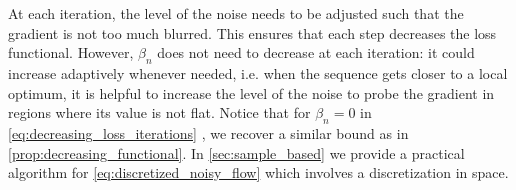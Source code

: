 At each iteration, the level of the noise needs to be adjusted such that the gradient is not too much blurred. This ensures that each step decreases the loss functional. However, $\beta_n$ does not need to decrease at each iteration: it could increase adaptively whenever needed, i.e. when  the sequence gets closer to a local optimum, it is helpful to increase the level of the noise to probe the gradient in regions where its value is not flat.
	Notice that for $\beta_n = 0$  in \cref{eq:decreasing_loss_iterations} , we recover a similar bound as in \cref{prop:decreasing_functional}.
In \cref{sec:sample_based} we provide a practical algorithm for \cref{eq:discretized_noisy_flow} which involves a discretization in space.
 
 
 
